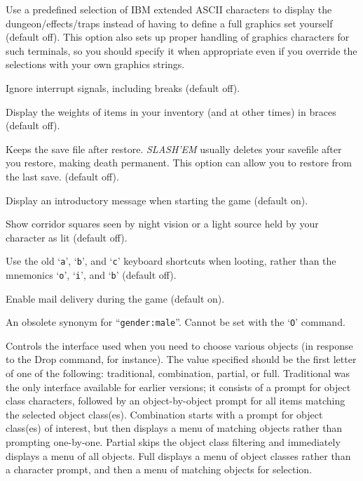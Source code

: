 \item[\ib{IBMgraphics}]
Use a predefined selection of IBM extended ASCII characters to display the
dungeon/effects/traps instead of having to define a full graphics set
yourself (default off).
This option also sets up proper handling of graphics
characters for such terminals, so you should specify it when appropriate
even if you override the selections with your own graphics strings.

\item[\ib{ignintr}]
Ignore interrupt signals, including breaks (default off).

\item[\ib{invweight}]
Display the weights of items in your inventory (and at other times)
in braces (default off).

\item[\ib{keep\_savefile}]
Keeps the save file after restore.  {\it SLASH'EM\/} usually deletes your savefile
after you restore,  making death permanent.  This option can allow you to
restore from the last save. (default off).

\item[\ib{legacy}]
Display an introductory message when starting the game (default on).

\item[\ib{lit\_corridor}]
Show corridor squares seen by night vision or a light source held by your
character as lit (default off).

\item[\ib{lootabc}]
Use the old `{\tt a}', `{\tt b}', and `{\tt c}' keyboard shortcuts when
looting, rather than the mnemonics `{\tt o}', `{\tt i}', and `{\tt b}' (default off).

\item[\ib{mail}]
Enable mail delivery during the game (default on).

\item[\ib{male}]
An obsolete synonym for ``{\tt gender:male}''.
Cannot be set with the `{\tt O}' command.

\item[\ib{menustyle}]
Controls the interface used when you need to choose various objects (in
response to the Drop command, for instance).  The value specified should
be the first letter of one of the following:  traditional, combination,
partial, or full.  Traditional was the only interface available for
earlier versions; it consists of a prompt for object class characters,
followed by an object-by-object prompt for all items matching the selected
object class(es).  Combination starts with a prompt for object class(es)
of interest, but then displays a menu of matching objects rather than
prompting one-by-one.  Partial skips the object class filtering and
immediately displays a menu of all objects.  Full displays a menu of
object classes rather than a character prompt, and then a menu of matching
objects for selection.

